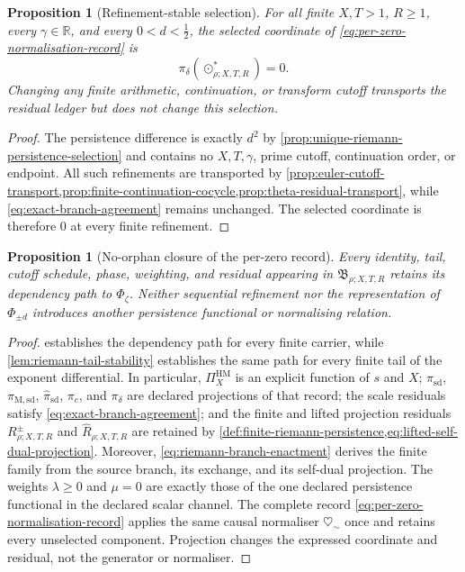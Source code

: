 \documentclass[11pt,a4paper]{article}
\newtheorem{proposition}[theorem]{Proposition}
\theoremstyle{definition}
\newcommand{\Field}{\Phi}
\newcommand{\heartsim}{\heartsuit_{\sim}}
\begin{document}
\begin{proposition}[Refinement-stable selection]
\label{prop:riemann-selection-refinement}
For all finite $X,T>1$, $R\geq1$, every $\gamma\in\mathbb R$, and every
$0<d<\tfrac12$, the selected coordinate of
\cref{eq:per-zero-normalisation-record} is
\begin{equation}
\label{eq:riemann-selection-refinement}
  \pi_\delta(\odot_{\rho;X,T,R}^\ast)=0.
\end{equation}
Changing any finite arithmetic, continuation, or transform cutoff transports
the residual ledger but does not change this selection.
\end{proposition}

\begin{proof}
The persistence difference is exactly $d^2$ by
\cref{prop:unique-riemann-persistence-selection} and contains no $X,T,\gamma$,
prime cutoff, continuation order, or endpoint. All such refinements are
transported by
\cref{prop:euler-cutoff-transport,prop:finite-continuation-cocycle,prop:theta-residual-transport},
while \cref{eq:exact-branch-agreement} remains unchanged. The selected
coordinate is therefore $0$ at every finite refinement.
\end{proof}

\begin{proposition}[No-orphan closure of the per-zero record]
\label{prop:riemann-no-orphan-closure}
Every identity, tail, cutoff schedule, phase, weighting, and residual appearing
in $\mathfrak B_{\rho;X,T,R}$ retains its dependency path to $\Field_\zeta$.
Neither sequential refinement nor the representation of $\Phi_{\pm d}$
introduces another persistence functional or normalising relation.
\end{proposition}

\begin{proof}
 establishes the dependency path for every
finite carrier, while \cref{lem:riemann-tail-stability} establishes the same
path for every finite tail of the exponent differential. In particular,
$\Pi_X^{\mathrm{HM}}$ is an explicit function of $s$ and $X$;
$\pi_{\mathrm{sd}}$, $\pi_{\mathrm{M,sd}}$,
$\widehat\pi_{\mathrm{sd}}$, $\pi_c$, and $\pi_\delta$ are declared
projections of that record; the scale residuals satisfy
\cref{eq:exact-branch-agreement}; and the finite and lifted projection
residuals $R_{\rho;X,T,R}^{\pm}$ and $\widehat R_{\rho;X,T,R}$ are retained by
\cref{def:finite-riemann-persistence,eq:lifted-self-dual-projection}. Moreover,
\cref{eq:riemann-branch-enactment} derives the finite family from the source
branch, its exchange, and its self-dual projection. The weights
$\lambda\geq0$ and $\mu=0$ are exactly those of the one declared persistence
functional in the declared scalar channel. The complete record
\cref{eq:per-zero-normalisation-record} applies the same causal normaliser
$\heartsim$ once and retains every unselected component. Projection changes
the expressed coordinate and residual, not the generator or normaliser.
\end{proof}
\end{document}
